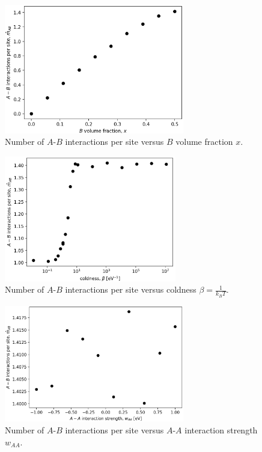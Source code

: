 \documentclass[10pt]{article}
\begin{document}
\begin{figure}[h!]
\centering
\includegraphics[width=0.70\textwidth]{Figures/m_AB_hat_versus_x.png}
\caption{Number of $A$-$B$ interactions per site versus $B$ volume fraction $x$.}
\label{fig:m_AB_hat_versus_x}
\end{figure}

\begin{figure}[h!]
\centering
\includegraphics[width=0.67\textwidth]{Figures/m_AB_hat_versus_beta.png}
\caption{Number of $A$-$B$ interactions per site versus coldness $\beta = \frac{1}{k_B T}$.}
\label{fig:m_AB_hat_versus_beta}
\end{figure}

\begin{figure}[h!]
\centering
\includegraphics[width=0.70\textwidth]{Figures/m_AB_hat_versus_w_AA.png}
\caption{Number of $A$-$B$ interactions per site versus $A$-$A$ interaction strength $w_{AA}$.}
\label{fig:m_AB_hat_versus_w_AA}
\end{figure}
\end{document}
